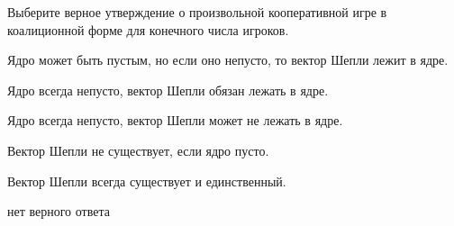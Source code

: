 
\begin{question}
Выберите верное утверждение о произвольной кооперативной игре в
коалиционной форме для конечного числа игроков.
\begin{answerlist}
  \item Ядро может быть пустым, но если оно непусто, то вектор Шепли лежит в
ядре.
  \item Ядро всегда непусто, вектор Шепли обязан лежать в ядре.
  \item Ядро всегда непусто, вектор Шепли может не лежать в ядре.
  \item Вектор Шепли не существует, если ядро пусто.
  \item Вектор Шепли всегда существует и единственный.
  \item нет верного ответа
\end{answerlist}
\end{question}


